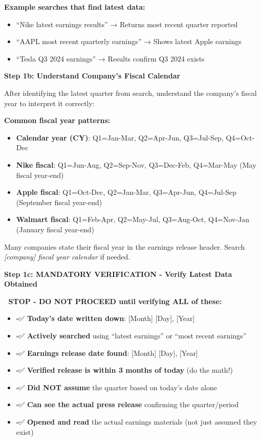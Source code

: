 \documentclass[11pt]{article}
\newcommand{\UncheckedBox}{$\square$}
\begin{document}
\textbf{Example searches that find latest data:}

\begin{itemize}[leftmargin=*,itemsep=2pt,topsep=2pt]
\item {} ``Nike latest earnings results'' → Returns most recent quarter reported
\item {} ``AAPL most recent quarterly earnings'' → Shows latest Apple earnings
\item {} ``Tesla Q3 2024 earnings'' → Results confirm Q3 2024 exists
\end{itemize}

\textbf{Step 1b: Understand Company's Fiscal Calendar}


After identifying the latest quarter from search, understand the company's fiscal year to interpret it correctly:


\textbf{Common fiscal year patterns:}

\begin{itemize}[leftmargin=*,itemsep=2pt,topsep=2pt]
\item {} \textbf{Calendar year (CY)}: Q1=Jan-Mar, Q2=Apr-Jun, Q3=Jul-Sep, Q4=Oct-Dec
\item {} \textbf{Nike fiscal}: Q1=Jun-Aug, Q2=Sep-Nov, Q3=Dec-Feb, Q4=Mar-May (May fiscal year-end)
\item {} \textbf{Apple fiscal}: Q1=Oct-Dec, Q2=Jan-Mar, Q3=Apr-Jun, Q4=Jul-Sep (September fiscal year-end)
\item {} \textbf{Walmart fiscal}: Q1=Feb-Apr, Q2=May-Jul, Q3=Aug-Oct, Q4=Nov-Jan (January fiscal year-end)
\end{itemize}

Many companies state their fiscal year in the earnings release header. Search \emph{[company] fiscal year calendar} if needed.


\textbf{Step 1c: MANDATORY VERIFICATION - Verify Latest Data Obtained}


🛑 \textbf{STOP - DO NOT PROCEED until verifying ALL of these:}


\begin{itemize}[leftmargin=*,itemsep=2pt,topsep=2pt]
\item {} \UncheckedBox ✅ \textbf{Today's date written down}: [Month] [Day], [Year]
\item {} \UncheckedBox ✅ \textbf{Actively searched} using ``latest earnings'' or ``most recent earnings''
\item {} \UncheckedBox ✅ \textbf{Earnings release date found}: [Month] [Day], [Year]
\item {} \UncheckedBox ✅ \textbf{Verified release is within 3 months of today} (do the math!)
\item {} \UncheckedBox ✅ \textbf{Did NOT assume} the quarter based on today's date alone
\item {} \UncheckedBox ✅ \textbf{Can see the actual press release} confirming the quarter/period
\item {} \UncheckedBox ✅ \textbf{Opened and read} the actual earnings materials (not just assumed they exist)
\end{itemize}
\end{document}

